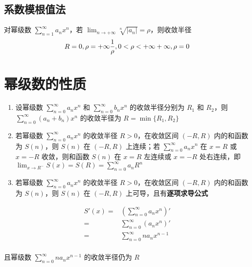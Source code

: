 \documentclass[lang = zh , final , oneside , openany , titlepage , zihao = -4 , linespread = 1.3 , baselineskip = false , cjk-font = windows , text-font = newtx , math-font = newtx , math-style = ISO , uppercase-greek = upright , integral-limits = false]{sjtureport}
\begin{document}
\subsection{系数模根值法}

\begin{theorem}
    对幂级数 \(\displaystyle \sum_{n=1}^\infty a_nx^n\)，若
\(\displaystyle \lim_{n\to+\infty}\sqrt[n]{\left\vert a_n\right\vert} = \rho\)，则收敛半径
\[\displaystyle R=\begin{aligned}0,\rho=+\infty\newline  \frac{1}{\rho}, 0<\rho<+\infty\newline +\infty ,\rho=0\end{aligned}\]
\end{theorem}

\section{幂级数的性质}

\begin{enumerate}
\item
  设幂级数 \(\displaystyle \sum_{n=0}^\infty a_nx^n\) 和
  \(\displaystyle \sum_{n=0}^\infty b_nx^n\) 的收敛半径分别为 \(R_1\) 和
  \(R_2\)，则 \(\displaystyle \sum_{n=0}^\infty (a_n+b_n)x^n\)
  的收敛半径为 \(R=\min\{R_1,R_2\}\)
\item
  若幂级数 \(\displaystyle \sum_{n=0}^\infty a_nx^n\) 的收敛半径
  \(R>0\)，在收敛区间 \((-R,R)\) 内的和函数为 \(S(n)\)，则 \(S(n)\) 在
  \((-R,R)\) 上连续；若 \(\displaystyle\sum_{n=0}^\infty a_nx^n\) 在
  \(x=R\) 或 \(x=-R\) 收敛，则和函数 \(S(n)\) 在 \(x=R\) 左连续或
  \(x=-R\) 处右连续，即
  \(\displaystyle \lim_{x\to R^-}S(x)=S(R)=\sum_{n=0}^\infty a_nR^n\)
\item
  若幂级数 \(\displaystyle \sum_{n=0}^\infty a_nx^n\) 的收敛半径
  \(R>0\)，在收敛区间 \((-R,R)\) 内的和函数为 \(S(n)\)，则 \(S(n)\) 在
  \((-R,R)\) 上可导，且有\textbf{逐项求导公式}
\end{enumerate}

\[\begin{aligned}
  S'(x) = &\left(\sum_{n=0}^\infty a_nx^n\right)'\\
    = &\sum_{n=0}^\infty \left(a_nx^n\right)'\\
    = &\sum_{n=0}^\infty na_nx^{n-1}\\
  \end{aligned}\]

且幂级数 \(\displaystyle \sum_{n=0}^\infty na_nx^{n-1}\) 的收敛半径仍为
\(R\)
\end{document}
